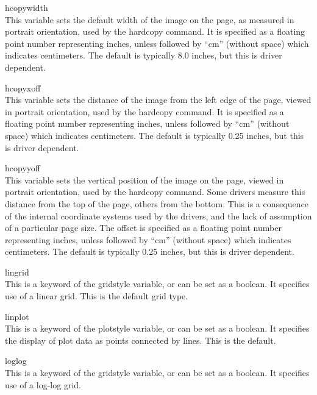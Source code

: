 \begin{description}
\item{\et hcopywidth}\\
This variable sets the default width of the image on the page, as
measured in portrait orientation, used by the {\cb hardcopy} command. 
It is specified as a floating point number representing inches, unless
followed by ``cm'' (without space) which indicates centimeters.  The
default is typically 8.0 inches, but this is driver dependent.

\item{\et hcopyxoff}\\
This variable sets the distance of the image from the left edge of the
page, viewed in portrait orientation, used by the {\cb hardcopy}
command.  It is specified as a floating point number representing
inches, unless followed by ``cm'' (without space) which indicates
centimeters.  The default is typically 0.25 inches, but this is driver
dependent.

\item{\et hcopyyoff}\\
This variable sets the vertical position of the image on the page,
viewed in portrait orientation, used by the {\cb hardcopy} command. 
Some drivers measure this distance from the top of the page, others
from the bottom.  This is a consequence of the internal coordinate
systems used by the drivers, and the lack of assumption of a
particular page size.  The offset is specified as a floating point
number representing inches, unless followed by ``cm'' (without space)
which indicates centimeters.  The default is typically 0.25 inches,
but this is driver dependent.

\item{\et lingrid}\\
This is a keyword of the {\et gridstyle} variable, or can be set as a
boolean.  It specifies use of a linear grid.  This is the default grid
type.

\item{\et linplot}\\
This is a keyword of the {\et plotstyle} variable, or can be set as a
boolean.  It specifies the display of plot data as points connected by
lines.  This is the default.

\item{\et loglog}\\
This is a keyword of the {\et gridstyle} variable, or can be set as a
boolean.  It specifies use of a log-log grid.


\end{description}
